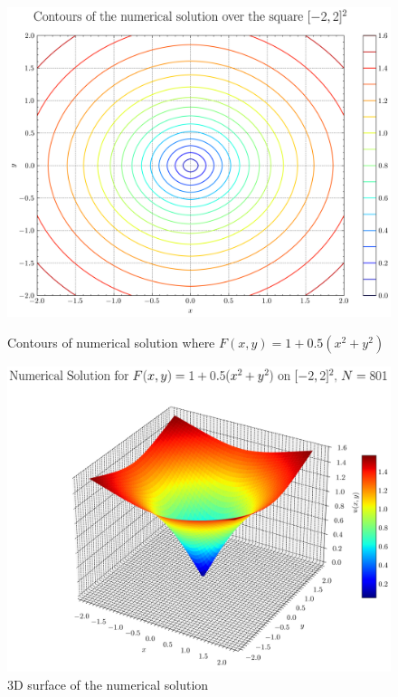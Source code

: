 \documentclass[11pt]{article}
\theoremstyle{definition}
\theoremstyle{remark}
\begin{document}
\begin{figure}[h]
  \centering
  \begin{minipage}{0.45\textwidth}
    \centering
    \includegraphics[width=\linewidth]{plots/contour_plot_arctan.png}
    \caption{Contours of numerical solution where $F(x,y)=1+0.5(x^2+y^2)$}
    \label{fig:contour_arctan}
  \end{minipage}
  \hfill
  \begin{minipage}{0.45\textwidth}
    \centering
    \includegraphics[width=\linewidth]{plots/solution_3d_surface_arctan.png}
    \caption{3D surface of the numerical solution}
    \label{fig:surface_arctan}
  \end{minipage}
\end{figure}
\end{document}
